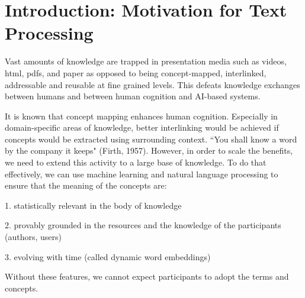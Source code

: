 \section{Introduction: Motivation for Text Processing} \label{Introduction} 

Vast amounts of knowledge are trapped in presentation media such as videos, html, pdfs, and paper as opposed to being concept-mapped, interlinked, addressable and reusable at fine grained levels. This defeats knowledge exchanges between humans and between human cognition and AI-based systems.

It is known that concept mapping enhances human cognition. Especially in domain-specific areas of knowledge, better interlinking would be achieved if concepts would be extracted using surrounding context. ``You shall know a word by the company it keeps" (Firth, 1957). However, in order to scale the benefits, we need to extend this activity to a large base of knowledge. To do that effectively, we can use  machine learning and natural language processing to ensure that the meaning of the concepts are:

1. statistically relevant in the body of knowledge

2. provably grounded in the resources and the knowledge of the participants (authors, users)

3. evolving with time (called dynamic word embeddings)

Without these features, we cannot expect participants to adopt the terms and concepts.

